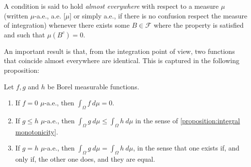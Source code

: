\begin{defn} A condition is said to hold \textit{almost everywhere} with
respect to a measure \(\mu\) (written \(\mu\)-a.e., a.e. [\(\mu\)] or simply
a.e., if there is no confusion respect the measure of integration) whenever
there exists some \(B\in\mathcal{F}\) where the property is satisfied and such that
\(\mu(B^c)=0\).
\end{defn}

An important result is that, from the integration point of view, two functions
that coincide almost everywhere are identical. This is captured in the following
proposition:

\begin{prop} Let \(f, g\) and \(h\) be Borel measurable functions.
	\begin{enumerate}
		\item \label{proposition:null a.e. has null integral}If \(f=0\)
\(\mu\)-a.e., then \(\int_{\Omega}f~d\mu=0\).
		\item \label{proposition:almost everywhere monotonicity of the
integral}If \(g\leq h\) \(\mu\)-a.e., then
\(\int_{\Omega}g~d\mu\leq \int_{\Omega}h~d\mu\) in the sense of
\cref{proposition:integral monotonicity}.
		\item \label{proposition:equality a.e. implies equality of integrals}If
\(g=h\) \(\mu\)-a.e., then \(\int_{\Omega}g~d\mu=\int_{\Omega}h~d\mu\), in the
sense that one exists if, and only if, the other one does, and they are equal.
	\end{enumerate}
	
\end{prop}
